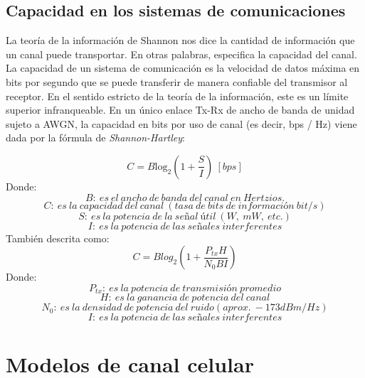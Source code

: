 \subsection{Capacidad en los sistemas de comunicaciones}

La teoría de la información de Shannon nos dice la cantidad de información que un canal puede transportar. En otras palabras, especifica la capacidad del canal. La capacidad de un sistema de comunicación es la velocidad de datos máxima en bits por segundo que se puede transferir de manera confiable del transmisor al receptor. En el sentido estricto de la teoría de la información, este es un límite superior infranqueable. En un único enlace Tx-Rx de ancho de banda de unidad sujeto a AWGN, la capacidad en bits por uso de canal (es decir, bps / Hz) viene dada por la fórmula de \emph{Shannon-Hartley}:\newline

\begin{equation}
C=B{{\mathrm{log}}_2 \left(1+\frac{S}{I}\right)\   [bps] }
\label{eqn:Shannon}
\end{equation}
Donde:
\[B:\ es\ el\ ancho\ de\ banda\ del\ canal\ en\ Hertzios.\]
\[C:\ es\ la\ capacidad\ del\ canal\ (tasa\ de\ bits\ de\ informaci\textrm{ó}n\ bit/s)\]
\[S:\ es\ la\ potencia\ de\ la\ se\textrm{\~{n}}al\ \textrm{ú}til\ (W,\ mW,\ etc.)\]
\[I:\ es\ la\ potencia\ de\ las\ señales\ interferentes \] 
También descrita como:
\begin{equation}
    C =Blog_2(1 + \frac {P_{tx} H}{N_0BI})
    \label{eqn:Shannon2}
\end{equation}
Donde:
\[P_{tx}:\ es\ la\ potencia\ de\ transmisión\ promedio\]
\[H:\ es\ la\ ganancia\ de\ potencia\ del\ canal\]
\[N_0:\ es\ la\ densidad\ de\ potencia\ del\ ruido (aprox. ~-173 dBm/Hz)\]
\[I:\ es\ la\ potencia\ de\ las\ señales\ interferentes \] 


\section{Modelos de canal celular}

